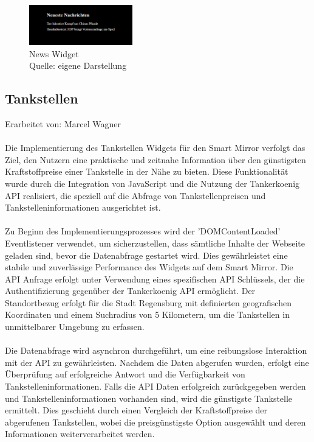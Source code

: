 \begin{figure}[h]
    \centering
    \includegraphics[width=0.4\textwidth]{pictures/news_widget.png}
  \captionsetup{justification=centering, labelformat=simple, singlelinecheck=false}
    \caption[News Widget]{News Widget\\ Quelle: eigene Darstellung}
\end{figure}

\subsection{Tankstellen}
Erarbeitet von: Marcel Wagner \\ \\
\noindent
Die Implementierung des Tankstellen Widgets für den Smart Mirror verfolgt das Ziel, den Nutzern eine praktische und zeitnahe Information über den günstigsten Kraftstoffpreise einer Tankstelle in der Nähe zu bieten. Diese Funktionalität wurde durch die Integration von JavaScript und die Nutzung der Tankerkoenig API realisiert, die speziell auf die Abfrage von Tankstellenpreisen und Tankstelleninformationen ausgerichtet ist. \\ \\
\noindent
Zu Beginn des Implementierungsprozesses wird der 'DOMContentLoaded' Eventlistener verwendet, um sicherzustellen, dass sämtliche Inhalte der Webseite geladen sind, bevor die Datenabfrage gestartet wird. Dies gewährleistet eine stabile und zuverlässige Performance des Widgets auf dem Smart Mirror. Die API Anfrage erfolgt unter Verwendung eines spezifischen API Schlüssels, der die Authentifizierung gegenüber der Tankerkoenig API ermöglicht. Der Standortbezug erfolgt für die Stadt Regensburg mit definierten geografischen Koordinaten und einem Suchradius von 5 Kilometern, um die Tankstellen in unmittelbarer Umgebung zu erfassen. \\ \\
\noindent
Die Datenabfrage wird asynchron durchgeführt, um eine reibungslose Interaktion mit der API zu gewährleisten. Nachdem die Daten abgerufen wurden, erfolgt eine Überprüfung auf erfolgreiche Antwort und die Verfügbarkeit von Tankstelleninformationen. Falls die API Daten erfolgreich zurückgegeben werden und Tankstelleninformationen vorhanden sind, wird die günstigste Tankstelle ermittelt. Dies geschieht durch einen Vergleich der Kraftstoffpreise der abgerufenen Tankstellen, wobei die preisgünstigste Option ausgewählt und deren Informationen weiterverarbeitet werden. \\ \\

